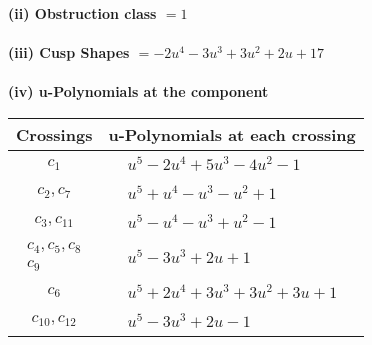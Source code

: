 \documentclass[1p]{elsarticle_modified}
\theoremstyle{definition}
\begin{document}
\flushleft \textbf{(ii) Obstruction class $= 1$}\\~\\
\flushleft \textbf{(iii) Cusp Shapes $= -2 u^4-3 u^3+3 u^2+2 u+17$}\\~\\
\newpage\renewcommand{\arraystretch}{1}
\flushleft \textbf{(iv) u-Polynomials at the component}\newline \\
\begin{tabular}{m{50pt}|m{274pt}}
Crossings & \hspace{64pt}u-Polynomials at each crossing \\
\hline $$\begin{aligned}c_{1}\end{aligned}$$&$\begin{aligned}
&u^5-2 u^4+5 u^3-4 u^2-1
\end{aligned}$\\
\hline $$\begin{aligned}c_{2},c_{7}\end{aligned}$$&$\begin{aligned}
&u^5+u^4- u^3- u^2+1
\end{aligned}$\\
\hline $$\begin{aligned}c_{3},c_{11}\end{aligned}$$&$\begin{aligned}
&u^5- u^4- u^3+u^2-1
\end{aligned}$\\
\hline $$\begin{aligned}c_{4},c_{5},c_{8}\\c_{9}\end{aligned}$$&$\begin{aligned}
&u^5-3 u^3+2 u+1
\end{aligned}$\\
\hline $$\begin{aligned}c_{6}\end{aligned}$$&$\begin{aligned}
&u^5+2 u^4+3 u^3+3 u^2+3 u+1
\end{aligned}$\\
\hline $$\begin{aligned}c_{10},c_{12}\end{aligned}$$&$\begin{aligned}
&u^5-3 u^3+2 u-1
\end{aligned}$\\
\hline
\end{tabular}\\~\\
\end{document}
